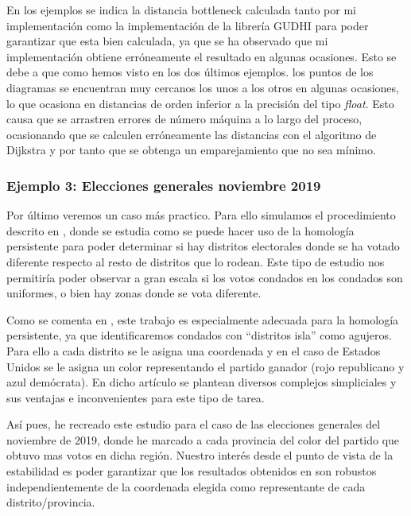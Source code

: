 
\begin{remark}
En los ejemplos se indica la distancia bottleneck calculada tanto por mi implementación como la implementación de la librería GUDHI \cite{gudhi:BottleneckDistance} para poder garantizar que esta bien calculada, ya que se ha observado que mi implementación obtiene erróneamente el resultado en algunas ocasiones. Esto se debe a que como hemos visto en los dos últimos ejemplos. los puntos de los diagramas se encuentran muy cercanos los unos a los otros en algunas ocasiones, lo que ocasiona en distancias de orden inferior a la precisión del tipo \textit{float}. Esto causa que se arrastren errores de número máquina a lo largo del proceso, ocasionando que se calculen erróneamente las distancias con el algoritmo de Dijkstra y por tanto que se obtenga un emparejamiento que no sea mínimo. 
\end{remark}

\subsubsection{Ejemplo 3: Elecciones generales noviembre 2019}
Por último veremos un caso más practico. Para ello simulamos el procedimiento descrito en \cite{votosArticulo}, donde se estudia como se puede hacer uso de la homología persistente para poder determinar si hay distritos electorales donde se ha votado diferente respecto al resto de distritos que lo rodean. Este tipo de estudio nos permitiría poder observar a gran escala si los votos condados en los condados son uniformes, o bien hay zonas donde se vota diferente.

Como se comenta en \cite{votosArticulo}, este trabajo es especialmente adecuada para la homología persistente, ya que identificaremos condados con ``distritos isla'' como agujeros. Para ello a cada distrito se le asigna una coordenada y en el caso de Estados Unidos se le asigna un color representando el partido ganador (rojo republicano y azul demócrata). En dicho artículo se plantean diversos complejos simpliciales y sus ventajas e inconvenientes para este tipo de tarea.

Así pues, he recreado este estudio para el caso de las elecciones generales del noviembre de 2019, donde he marcado a cada provincia del color del partido que obtuvo mas votos en dicha región. Nuestro interés desde el punto de vista de la estabilidad es poder garantizar que los resultados obtenidos en \cite{votosArticulo} son robustos independientemente de la coordenada elegida como representante de cada distrito/provincia.

